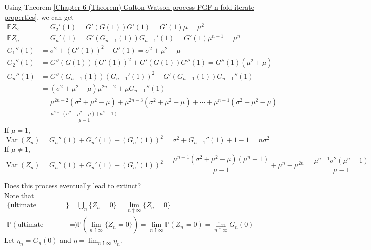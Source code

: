 \documentclass{huhtakm-template-book}
\newcommand{\prob}{\mathbb{P}}
\newcommand{\expect}{\mathbb{E}}
\DeclareMathOperator{\Var}{Var}
\begin{document}
\begin{proofing}
	Using Theorem \ref{Chapter 6 (Theorem) Galton-Watson process PGF n-fold iterate properties}, we can get
	\begin{align*}
		\expect Z_{2}&=G_{2}'(1)=G'(G(1))G'(1)=G'(1)\mu=\mu^{2}\\
		\expect Z_{n}&=G_{n}'(1)=G'(G_{n-1}(1))G_{n-1}'(1)=G'(1)\mu^{n-1}=\mu^{n}\\
		G_{1}''(1)&=\sigma^{2}+(G'(1))^{2}-G'(1)=\sigma^{2}+\mu^{2}-\mu\\
		G_{2}''(1)&=G''(G(1))(G'(1))^{2}+G'(G(1))G''(1)=G''(1)(\mu^{2}+\mu)\\
		G_{n}''(1)&=G''(G_{n-1}(1))(G_{n-1}'(1))^{2}+G'(G_{n-1}(1))G_{n-1}''(1)\\
		&=(\sigma^{2}+\mu^{2}-\mu)\mu^{2n-2}+\mu G_{n-1}''(1)\\
		&=\mu^{2n-2}(\sigma^{2}+\mu^{2}-\mu)+\mu^{2n-3}(\sigma^{2}+\mu^{2}-\mu)+\cdots+\mu^{n-1}(\sigma^{2}+\mu^{2}-\mu)\\
		&=\frac{\mu^{n-1}(\sigma^{2}+\mu^{2}-\mu)(\mu^{n}-1)}{\mu-1}
	\end{align*}
	If $\mu=1$,
	\begin{equation*}
		\Var(Z_{n})=G_{n}''(1)+G_{n}'(1)-(G_{n}'(1))^{2}=\sigma^{2}+G_{n-1}''(1)+1-1=n\sigma^{2}
	\end{equation*}
	If $\mu\neq 1$,
	\begin{equation*}
		\Var(Z_{n})=G_{n}''(1)+G_{n}'(1)-(G_{n}'(1))^{2}=\frac{\mu^{n-1}(\sigma^{2}+\mu^{2}-\mu)(\mu^{n}-1)}{\mu-1}+\mu^{n}-\mu^{2n}=\frac{\mu^{n-1}\sigma^{2}(\mu^{n}-1)}{\mu-1}
	\end{equation*}
\end{proofing}
\begin{eg}
	Does this process eventually lead to extinct?\\
	Note that
	\begin{align*}
		\{\text{ultimate extinction}\}&=\bigcup_{n}\{Z_{n}=0\}=\lim_{n\uparrow\infty}\{Z_{n}=0\}\\
		\prob(\text{ultimate extinction})&=\prob\left(\lim_{n\uparrow\infty}\{Z_{n}=0\}\right)=\lim_{n\uparrow\infty}\prob(Z_{n}=0)=\lim_{n\uparrow\infty}G_{n}(0)
	\end{align*}
	Let $\eta_{n}=G_{n}(0)$ and $\eta=\lim_{n\uparrow\infty}\eta_{n}$.
\end{eg}
\end{document}
